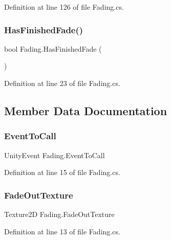Definition at line 126 of file Fading.\+cs.

\mbox{\label{class_fading_a183a11289805b24a337317a338c8b488}} 
\subsubsection{\texorpdfstring{Has\+Finished\+Fade()}{HasFinishedFade()}}
{\footnotesize\ttfamily bool Fading.\+Has\+Finished\+Fade (\begin{DoxyParamCaption}{ }\end{DoxyParamCaption})}



Definition at line 23 of file Fading.\+cs.



\subsection{Member Data Documentation}
\mbox{\label{class_fading_ad48fed18d4d8d59440fca235f2f61b07}} 
\subsubsection{\texorpdfstring{Event\+To\+Call}{EventToCall}}
{\footnotesize\ttfamily Unity\+Event Fading.\+Event\+To\+Call}



Definition at line 15 of file Fading.\+cs.

\mbox{\label{class_fading_a1dfc14543e7463214e9186b592944f12}} 
\subsubsection{\texorpdfstring{Fade\+Out\+Texture}{FadeOutTexture}}
{\footnotesize\ttfamily Texture2D Fading.\+Fade\+Out\+Texture}



Definition at line 13 of file Fading.\+cs.

\mbox{\label{class_fading_a8c33e07faed3d06ad034fcc17216a783}} 
